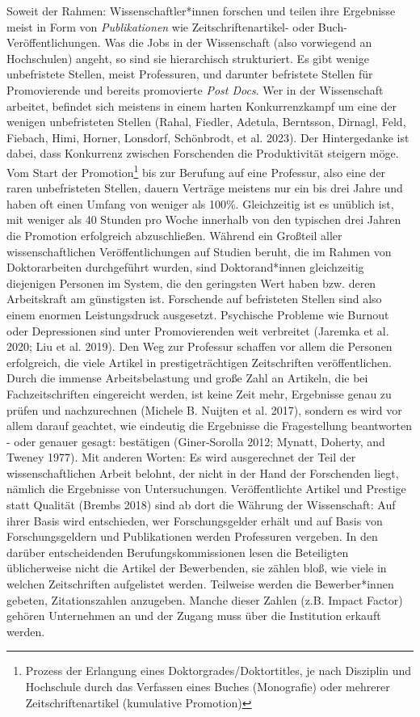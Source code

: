 \documentclass[
  letterpaper,
  DIV=11,
  numbers=noendperiod]{scrreprt}
\begin{document}
Soweit der Rahmen: Wissenschaftler*innen forschen und teilen ihre
Ergebnisse meist in Form von \emph{Publikationen} wie
Zeitschriftenartikel- oder Buch-Veröffentlichungen. Was die Jobs in der
Wissenschaft (also vorwiegend an Hochschulen) angeht, so sind sie
hierarchisch strukturiert. Es gibt wenige unbefristete Stellen, meist
Professuren, und darunter befristete Stellen für Promovierende und
bereits promovierte \emph{Post Docs}. Wer in der Wissenschaft arbeitet,
befindet sich meistens in einem harten Konkurrenzkampf um eine der
wenigen unbefristeten Stellen (Rahal, Fiedler, Adetula, Berntsson,
Dirnagl, Feld, Fiebach, Himi, Horner, Lonsdorf, Schönbrodt, et al.
2023). Der Hintergedanke ist dabei, dass Konkurrenz zwischen Forschenden
die Produktivität steigern möge. Vom Start der Promotion\footnote{Prozess
  der Erlangung eines Doktorgrades/Doktortitles, je nach Disziplin und
  Hochschule durch das Verfassen eines Buches (Monografie) oder mehrerer
  Zeitschriftenartikel (kumulative Promotion)} bis zur Berufung auf eine
Professur, also eine der raren unbefristeten Stellen, dauern Verträge
meistens nur ein bis drei Jahre und haben oft einen Umfang von weniger
als 100\%. Gleichzeitig ist es unüblich ist, mit weniger als 40 Stunden
pro Woche innerhalb von den typischen drei Jahren die Promotion
erfolgreich abzuschließen. Während ein Großteil aller wissenschaftlichen
Veröffentlichungen auf Studien beruht, die im Rahmen von Doktorarbeiten
durchgeführt wurden, sind Doktorand*innen gleichzeitig diejenigen
Personen im System, die den geringsten Wert haben bzw. deren
Arbeitskraft am günstigsten ist. Forschende auf befristeten Stellen sind
also einem enormen Leistungsdruck ausgesetzt. Psychische Probleme wie
Burnout oder Depressionen sind unter Promovierenden weit verbreitet
(Jaremka et al. 2020; Liu et al. 2019). Den Weg zur Professur schaffen
vor allem die Personen erfolgreich, die viele Artikel in
prestigeträchtigen Zeitschriften veröffentlichen. Durch die immense
Arbeitsbelastung und große Zahl an Artikeln, die bei Fachzeitschriften
eingereicht werden, ist keine Zeit mehr, Ergebnisse genau zu prüfen und
nachzurechnen (Michele B. Nuijten et al. 2017), sondern es wird vor
allem darauf geachtet, wie eindeutig die Ergebnisse die Fragestellung
beantworten - oder genauer gesagt: bestätigen (Giner-Sorolla 2012;
Mynatt, Doherty, and Tweney 1977). Mit anderen Worten: Es wird
ausgerechnet der Teil der wissenschaftlichen Arbeit belohnt, der nicht
in der Hand der Forschenden liegt, nämlich die Ergebnisse von
Untersuchungen. Veröffentlichte Artikel und Prestige statt Qualität
(Brembs 2018) sind ab dort die Währung der Wissenschaft: Auf ihrer Basis
wird entschieden, wer Forschungsgelder erhält und auf Basis von
Forschungsgeldern und Publikationen werden Professuren vergeben. In den
darüber entscheidenden Berufungskommissionen lesen die Beteiligten
üblicherweise nicht die Artikel der Bewerbenden, sie zählen bloß, wie
viele in welchen Zeitschriften aufgelistet werden. Teilweise werden die
Bewerber*innen gebeten, Zitationszahlen anzugeben. Manche dieser Zahlen
(z.B. Impact Factor) gehören Unternehmen an und der Zugang muss über die
Institution erkauft werden.
\end{document}
